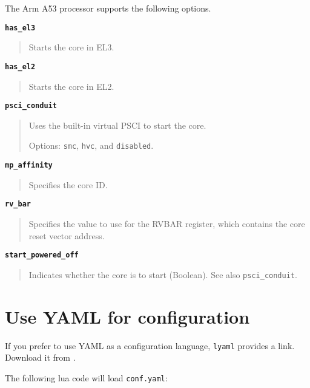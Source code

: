 The Arm A53 processor supports the following options.

{\textbf {\footnotesize{\lstinline!has_el3!}}}
\vspace{-2pt}
\begin{quote}
Starts the core in EL3.
\end{quote}


{\textbf {\footnotesize{\lstinline!has_el2!}}}
\vspace{-2pt}
\begin{quote}
Starts the core in EL2.
\end{quote}


{\textbf {\footnotesize{\lstinline!psci_conduit!}}}
\vspace{-2pt}
\begin{quote}
Uses the built-in virtual PSCI to start the core.

Options: {\small{\lstinline!smc!}}, {\small{\lstinline!hvc!}}, and {\small{\lstinline!disabled!}}.
\end{quote}


{\textbf {\footnotesize{\lstinline!mp_affinity!}}}
\vspace{-2pt}
\begin{quote}
Specifies the core ID.
\end{quote}


{\textbf {\footnotesize{\lstinline!rv_bar!}}}
\vspace{-2pt}
\begin{quote}
Specifies the value to use for the RVBAR register, which contains the core reset vector address.
\end{quote}


{\textbf {\footnotesize{\lstinline!start_powered_off!}}}
\vspace{-2pt}
\begin{quote}
Indicates whether the core is to start (Boolean). See also {\small{\lstinline!psci_conduit!}}.
\end{quote}


\section{Use YAML for configuration}

If you prefer to use YAML as a configuration language, {\small{\lstinline!lyaml!}} provides a link. Download it from {}.

The following lua code will load {\small{\lstinline!conf.yaml!}}:

